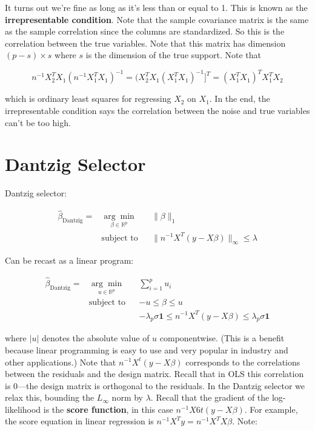 It turns out we're fine as long as it's less than or equal to 1. This is known as the \textbf{irrepresentable condition}. Note that the sample covariance matrix is the same as the sample correlation since the columns are standardized. So this is the correlation between the true variables. Note that this matrix has dimension \((p-s) \times s\) where \(s\) is the dimension of the true support. Note that

\[
n^{-1} X_2^T X_1( n^{-1}X_1^T X_1)^{-1} = (X_2^T X_1 (X_1^T X_1)^{-1}]^T =(X_1^T X_1)^T X_1^T X_2
 \]
 
which is ordinary least squares for regressing \(X_2\) on \(X_1\). In the end, the irrepresentable condition says the correlation between the noise and true variables can't be too high.

\section{Dantzig Selector}

Dantzig selector:


\[
\begin{aligned}
\hat{\beta}_{\text{Dantzig}}  =  & {\underset {\beta \in \mathbb{R}^p}{\arg \min}}
& &  \lVert \beta \rVert_1 \\
& \text{subject to}
& &  \lVert n^{-1} X^T(y - X \beta) \rVert_\infty \leq \lambda
\end{aligned}
\]

Can be recast as a linear program:

\begin{equation}\label{linreg.dantzig.lp}
\begin{aligned}
\hat{\beta}_{\text{Dantzig}} =  & {\underset {u \in \mathbb{R}^p}{\arg \min}}
& & \sum_{i=1}^p u_i  \\
& \text{subject to}
& & -u \leq \beta \leq u \\
& & & -\lambda_p \sigma \boldsymbol{1} \leq n^{-1} X^T(y - X \beta) \leq \lambda_p \sigma \boldsymbol{1}
\end{aligned}
\end{equation}

where \(|u|\) denotes the absolute value of \(u\) componentwise. (This is a benefit because linear programming is easy to use and very popular in industry and other applications.) Note that \( n^{-1} X^t(y - X \beta) \) corresponds to the correlations between the residuals and the design matrix. Recall that in OLS this correlation is 0---the design matrix is orthogonal to the residuals. In the Dantzig selector we relax this, bounding the \(L_\infty\) norm by \(\lambda\). Recall that the gradient of the log-likelihood is the \textbf{score function}, in this case \(n^{-1} X6t(y - X \beta)\). For example, the score equation in linear regression is \(n^{-1} X^Ty = n^{-1} X^T X \beta\). Note:

